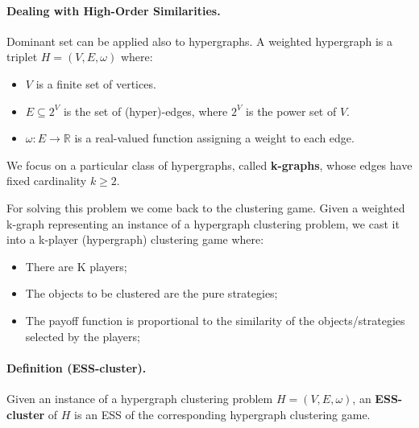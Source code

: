 \paragraph*{Dealing with High-Order Similarities.} Dominant set can be applied also to hypergraphs. A weighted hypergraph is a triplet $H = (V,E,\omega)$ where:
\begin{itemize}
	\item $V$ is a finite set of vertices.
	\item $E \subseteq 2^V$ is the set of (hyper)-edges, where $2^V$ is the power set of $V$.
	\item $\omega:E\rightarrow \mathbb{R}$ is a real-valued function assigning a weight to each edge.
\end{itemize}
We focus on a particular class of hypergraphs, called \textbf{k-graphs}, whose edges have fixed cardinality $k \geq 2$.

For solving this problem we come back to the clustering game. Given a weighted k-graph representing an instance of a hypergraph clustering problem, we cast it into a k-player (hypergraph) clustering game where:
\begin{itemize}
	\item There are K players;
	\item The objects to be clustered are the pure strategies;
	\item The payoff function is proportional to the similarity of the objects/strategies selected by the players;
\end{itemize}

\paragraph{Definition (ESS-cluster).} Given an instance of a hypergraph clustering problem $H = (V,E, \omega)$, an \textbf{ESS-cluster} of $H$ is an ESS of the corresponding hypergraph clustering game.


